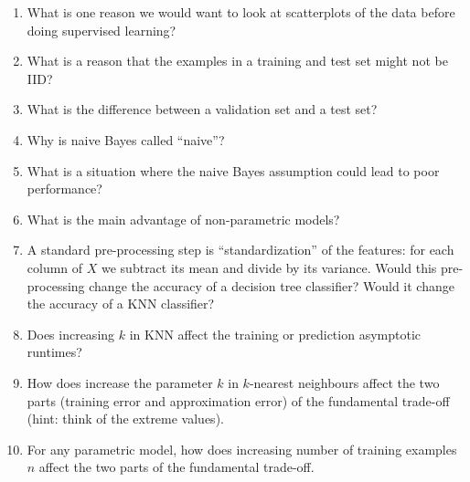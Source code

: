 \documentclass{article}
\def\enum#1{\begin{enumerate}#1\end{enumerate}}
\begin{document}
\enum{
\item What is one reason we would want to look at scatterplots of the data before doing supervised learning?
\item What is a reason that the examples in a training and test set might not be IID?
\item What is the difference between a validation set and a test set?
\item Why is  naive Bayes called ``naive''?
\item What is a situation where the naive Bayes assumption could lead to poor performance?
\item What is the main advantage of non-parametric models?
\item A standard pre-processing step is ``standardization'' of the features: for each column of $X$ we subtract its mean and divide by its variance. Would this pre-processing change the accuracy of a decision tree classifier? Would it change the accuracy of a KNN classifier?
\item Does increasing $k$ in KNN affect the training or prediction asymptotic runtimes?
\item How does increase the parameter $k$ in $k$-nearest neighbours affect the two parts (training error and approximation error) of the fundamental trade-off (hint: think of the extreme values).
\item For any parametric model, how does increasing number of training examples $n$ affect the two parts of the fundamental trade-off.
}
\end{document}
